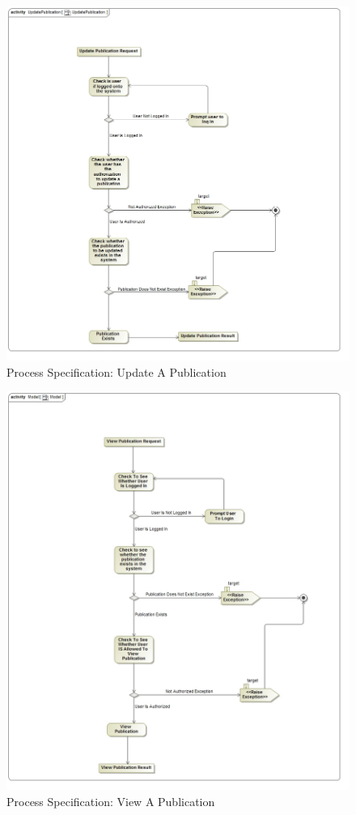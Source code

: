 \documentclass[a4paper]{article}
\begin{document}
		\begin{figure}[H]
	    \centering
	    \includegraphics[width=\textwidth]{../Assignment1/UpdatePublication.jpg}
	    \caption{Process Specification: Update A Publication}
	\end{figure}
		\begin{figure}[H]
	    \centering
	    \includegraphics[width=\textwidth]{../Assignment1/ViewPublication.jpg}
	    \caption{Process Specification: View A Publication}
	\end{figure}
\end{document}
